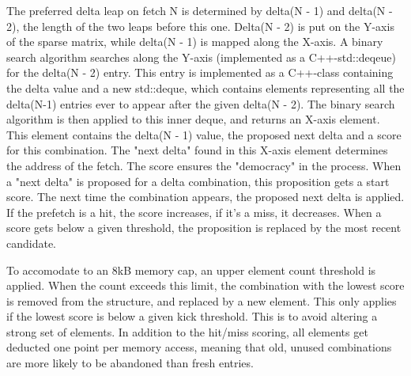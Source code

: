 The preferred delta leap on fetch N is determined by delta(N - 1) and delta(N - 2), the length of the two leaps before this one. Delta(N - 2) is put on the Y-axis of the sparse matrix, while delta(N - 1) is mapped along the X-axis. A binary search algorithm searches along the Y-axis (implemented as a C++-std::deqeue) for the delta(N - 2) entry. This entry is implemented as a C++-class containing the delta value and a new std::deque, which contains elements representing all the delta(N-1) entries ever to appear after the given delta(N - 2). The binary search algorithm is then applied to this inner deque, and returns an X-axis element. This element contains the delta(N - 1) value, the proposed next delta and a score for this combination. The "next delta" found in this X-axis element determines the address of the fetch. The score ensures the "democracy" in the process. When a "next delta" is proposed for a delta combination, this proposition gets a start score. The next time the combination appears, the proposed next delta is applied. If the prefetch is a hit, the score increases, if it's a miss, it decreases. When a score gets below a given threshold, the proposition is replaced by the most recent candidate. 

To accomodate to an 8kB memory cap, an upper element count threshold is applied. When the count exceeds this limit, the combination with the lowest score is removed from the structure, and replaced by a new element. This only applies if the lowest score is below a given kick threshold. This is to avoid altering a strong set of elements. In addition to the hit/miss scoring, all elements get deducted one point per memory access, meaning that old, unused combinations are more likely to be abandoned than fresh entries.

